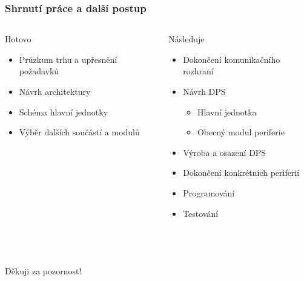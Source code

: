 \documentclass[%
  12pt,       				%
	t,                  %
	aspectratio=1610,   %
	unicode,						%
]{beamer}				    	%
\begin{document}
\begin{frame}[fragile]
	\frametitle{Shrnutí práce a další postup}

	\begin{columns}[T] 								%
		\begin{column}{0.5\textwidth}		%
			\begin{block}{Hotovo}
				\begin{itemize}
					\item Průzkum trhu a upřesnění požadavků
					\item Návrh architektury 
					\item Schéma hlavní jednotky
					\item Výběr dalších součástí a modulů 
				\end{itemize}
			\end{block}
		\end{column}
		\begin{column}{0.5\textwidth}		%
			\begin{alertblock}{Následuje}
				\begin{itemize}
					\item Dokončení komunikačního rozhraní
					\item Návrh DPS
					\begin{itemize}
						\item Hlavní jednotka
						\item Obecný modul periferie
					\end{itemize}
					\item Výroba a osazení DPS 
					\item Dokončení konkrétních periferií
					\item Programování
					\item Testování
				\end{itemize}
			\end{alertblock}
		\end{column}
	\end{columns}											%
\end{frame}



\begin{frame}[c] 
	\frametitle{\mbox{ }}
	\begin{center}
		{\Huge Děkuji za pozornost!}
	\end{center}
\end{frame}
\end{document}
